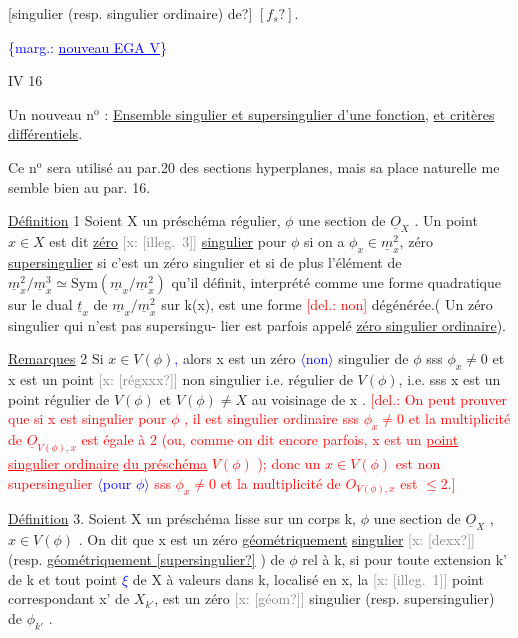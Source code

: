 \documentclass[11pt]{article}
\newcommand{\scanpage}[1]{\par\bigskip\noindent{\small\sffamily[scan #1]}\par}
\newcommand{\mspage}[1]{{\small\sffamily[p.\,#1]}}
\newcommand{\hand}[1]{\textcolor{blue}{#1}}
\newcommand{\inserted}[2][]{\textcolor{blue}{$\langle$#2$\rangle$}}
\newcommand{\margin}[1]{\textcolor{blue}{\{\textsf{marg.:} #1\}}}
\newcommand{\deleted}[1]{\textcolor{red}{[\textsf{del.:} #1]}}
\newcommand{\xout}[1]{\textcolor{gray}{[\textsf{x:} #1]}}
\newcommand{\uline}[1]{\underline{#1}}
\newcommand{\unsure}[1]{[#1?]}
\newcommand{\illegible}[1]{[\textsf{illeg.\ #1}]}
\begin{document}
\unsure{singulier (resp. singulier ordinaire) de} $\unsure{f_{s}}$.

\mspage{\hand{139}}

\clearpage
\scanpage{25/140}
\margin{\uline{nouveau EGA V}}

IV 16

Un nouveau n$^{\text{o}}$ : \uline{Ensemble singulier et supersingulier d'une fonction},
\uline{et critères différentiels}.

Ce n$^{\text{o}}$ sera utilisé au par.20 des sections hyperplanes, mais sa
place naturelle me semble bien au par. 16.

\uline{Définition} 1 Soient X un préschéma régulier, $\phi$ une section de $\underline{O}_X$ . Un
point $x \in X$ est dit \uline{zéro} \xout{\illegible{3}} \uline{singulier} pour $\phi$
si on a $\phi_x \in \underline{m}_x^2$, zéro \uline{supersingulier} si c'est un zéro singulier
et si de plus l'élément de $\underline{m}_x^2/\underline{m}_x^3 \simeq \mathrm{Sym}(\underline{m}_x/\underline{m}_x^2)$ qu'il définit,
interprété comme une forme quadratique sur le dual $\underline{t}_x$ de $\underline{m}_x/\underline{m}_x^2$ sur k(x),
est une forme \deleted{non} dégénérée.( Un zéro singulier qui n'est pas supersingu-%
lier est parfois appelé \uline{zéro singulier ordinaire}).

\uline{Remarques} 2 Si $x \in V(\phi)$\hand{,} alors x est un zéro \inserted{non} singulier de $\phi$ sss
$\phi_x \neq 0$ et x est un point \xout{\unsure{régxxx}} non singulier i.e. régulier de $V(\phi)$,
i.e. sss x est un point régulier de $V(\phi)$ et $V(\phi) \neq X$ au voisinage de
x . \deleted{On peut prouver que si x est singulier pour $\phi$ , il est singulier
ordinaire sss $\phi_x \neq 0$ et la multiplicité de $\underline{O}_{V(\phi),x}$ est égale à 2
(ou, comme on dit encore parfois, x est un \uline{point singulier ordinaire}
\uline{du préschéma} $V(\phi)$ ); donc un $x \in V(\phi)$ est non supersingulier \inserted{pour $\phi$} sss
$\phi_x \neq 0$ et la multiplicité de $O_{V(\phi),x}$ est $\leq 2$.}

\uline{Définition} 3. Soient X un préschéma lisse sur un corps k, $\phi$ une
section de $\underline{O}_X$ , $x \in V(\phi)$ . On dit que x est un zéro \uline{géométriquement}
\uline{singulier} \xout{\unsure{dexx}} (resp. \uline{géométriquement \unsure{supersingulier}} ) de $\phi$ rel à k,
si pour toute extension k' de k et tout point \hand{$\xi$} de X à valeurs dans
k\hand{,} localisé en x, la \xout{\illegible{1}} point correspondant x' de $X_{k'}$, est un zéro
\xout{\unsure{géom}} singulier (resp. supersingulier) de $\phi_{k'}$ .
\end{document}
